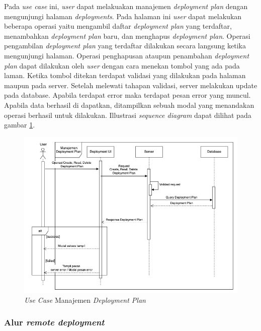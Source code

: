 Pada \textit{use case} ini, \textit{user} dapat melakuakan manajemen \textit{deployment plan} dengan mengunjungi halaman \textit{deployments}. Pada halaman ini \textit{user} dapat melakukan beberapa operasi yaitu mengambil daftar \textit{deployment plan} yang terdaftar, menambahkan \textit{deployment plan} baru, dan menghapus \textit{deployment plan}. Operasi pengambilan \textit{deployment plan} yang terdaftar dilakukan secara langsung ketika mengunjungi halaman. Operasi penghapusan ataupun penambahan \textit{deployment plan} dapat dilakukan oleh \textit{user} dengan cara menekan tombol yang ada pada laman. Ketika tombol ditekan terdapat validasi yang dilakukan pada halaman maupun pada server. Setelah melewati tahapan validasi, server melakukan update pada database. Apabila terdapat error maka terdapat pesan error yang muncul. Apabila data berhasil di dapatkan, ditampilkan sebuah modal yang menandakan operasi berhasil untuk dilakukan. Illustrasi \textit{sequence diagram} dapat dilihat pada gambar \ref{fig:usecase-11}.


\begin{figure}[ht]
  \centering
  \includegraphics[width=1\textwidth]{resources/chapter-3/usecase/uc-11.jpg}
  \caption{\textit{Use Case} Manajemen \textit{Deployment Plan}}
  \label{fig:usecase-11}
\end{figure}

\pagebreak

\subsubsection{Alur \textit{remote deployment}}

